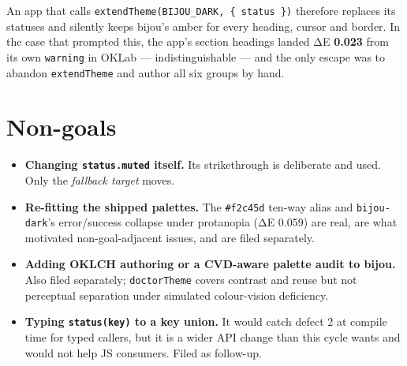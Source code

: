 An app that calls \texttt{e\allowbreak{}x\allowbreak{}t\allowbreak{}e\allowbreak{}n\allowbreak{}d\allowbreak{}T\allowbreak{}h\allowbreak{}e\allowbreak{}m\allowbreak{}e\allowbreak{}(\allowbreak{}B\allowbreak{}I\allowbreak{}J\allowbreak{}O\allowbreak{}U\allowbreak{}\_\allowbreak{}D\allowbreak{}A\allowbreak{}R\allowbreak{}K\allowbreak{},\allowbreak{} \allowbreak{}\{\allowbreak{} \allowbreak{}s\allowbreak{}t\allowbreak{}a\allowbreak{}t\allowbreak{}u\allowbreak{}s\allowbreak{} \allowbreak{}\}\allowbreak{})} therefore replaces its statuses and silently keeps bijou's amber for every heading, cursor and border. In the case that prompted this, the app's section headings landed ΔE \textbf{0.023} from its own \texttt{w\allowbreak{}a\allowbreak{}r\allowbreak{}n\allowbreak{}i\allowbreak{}n\allowbreak{}g} in OKLab --- indistinguishable --- and the only escape was to abandon \texttt{e\allowbreak{}x\allowbreak{}t\allowbreak{}e\allowbreak{}n\allowbreak{}d\allowbreak{}T\allowbreak{}h\allowbreak{}e\allowbreak{}m\allowbreak{}e} and author all six groups by hand.

\section{Non-goals}\label{record-147-non-goals}

\begin{itemize}
\tightlist
\item
  \textbf{Changing \texttt{s\allowbreak{}t\allowbreak{}a\allowbreak{}t\allowbreak{}u\allowbreak{}s\allowbreak{}.\allowbreak{}m\allowbreak{}u\allowbreak{}t\allowbreak{}e\allowbreak{}d} itself.} Its strikethrough is deliberate and used. Only the \emph{fallback target} moves.
\item
  \textbf{Re-fitting the shipped palettes.} The \texttt{\#\allowbreak{}f\allowbreak{}2\allowbreak{}c\allowbreak{}4\allowbreak{}5\allowbreak{}d} ten-way alias and \texttt{b\allowbreak{}i\allowbreak{}j\allowbreak{}o\allowbreak{}u\allowbreak{}-\allowbreak{}d\allowbreak{}a\allowbreak{}r\allowbreak{}k}'s error/success collapse under protanopia (ΔE 0.059) are real, are what motivated non-goal-adjacent issues, and are filed separately.
\item
  \textbf{Adding OKLCH authoring or a CVD-aware palette audit to bijou.} Also filed separately; \texttt{d\allowbreak{}o\allowbreak{}c\allowbreak{}t\allowbreak{}o\allowbreak{}r\allowbreak{}T\allowbreak{}h\allowbreak{}e\allowbreak{}m\allowbreak{}e} covers contrast and reuse but not perceptual separation under simulated colour-vision deficiency.
\item
  \textbf{Typing \texttt{s\allowbreak{}t\allowbreak{}a\allowbreak{}t\allowbreak{}u\allowbreak{}s\allowbreak{}(\allowbreak{}k\allowbreak{}e\allowbreak{}y\allowbreak{})} to a key union.} It would catch defect 2 at compile time for typed callers, but it is a wider API change than this cycle wants and would not help JS consumers. Filed as follow-up.
\end{itemize}

